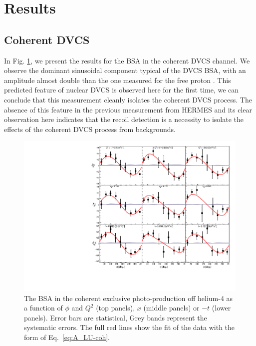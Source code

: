 \documentclass[aps,prc,preprint,superscriptaddress]{revtex4}
\begin{document}
\section{Results}

\subsection{Coherent DVCS}

In Fig. \ref{fig:CohALUphi}, we present the results for the BSA in the coherent DVCS channel. We 
observe the dominant sinusoidal component typical of the DVCS BSA, with an amplitude almost 
double than the one measured for the free proton \cite{Jo:2015ema}. This 
predicted feature of nuclear DVCS \cite{Guzey:2003jh} is observed here for the first time, we
can conclude that this measurement cleanly isolates the coherent DVCS process. The absence of 
this feature in the previous measurement from HERMES \cite{Airapetian:2009cga} and its clear observation here indicates that the recoil 
detection is a necessity to isolate the effects of the coherent DVCS process from backgrounds. 

\begin{figure}[bp!]
\center
\includegraphics[width=12cm]{fig3/Coherent_ALU_phi.pdf}
	\caption{The BSA in the coherent exclusive photo-production off helium-4 as a 
	function of $\phi$ and $Q^2$ 
	(top panels), $x$ (middle panels) or $-t$ (lower panels). Error bars are  
	statistical, Grey bands represent the systematic errors. The full red lines show
	the fit of the data with the form of Eq.~\ref{eq:A_LU-coh}.}
\label{fig:CohALUphi}
\end{figure}
\end{document}
